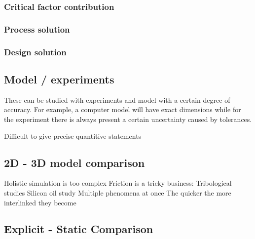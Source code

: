 \subsubsection{Critical factor contribution}


\subsubsection{Process solution}
\subsubsection{Design solution}

\subsection{Model / experiments}
These can be studied with experiments and model with a certain degree of accuracy. For example, a computer model will have exact dimensions while for the experiment there is always present a certain uncertainty caused by tolerances. 

Difficult to give precise quantitive statements


\subsection{2D - 3D model comparison}
Holistic simulation is too complex
Friction is a tricky business: 
Tribological studies
Silicon oil study
Multiple phenomena at once
The quicker the more interlinked they become

\subsection{Explicit - Static Comparison}

